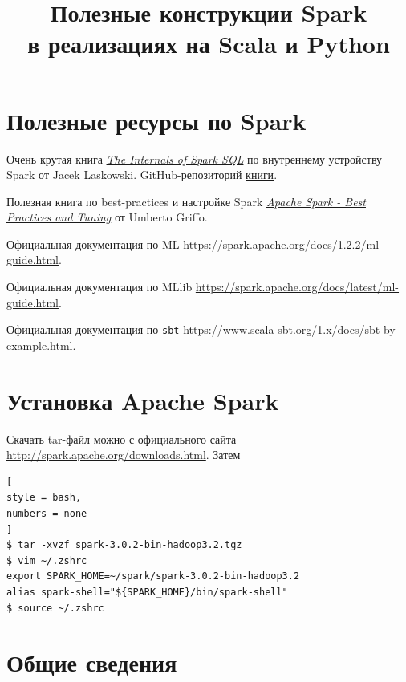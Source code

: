 \documentclass[%
	11pt,
	a4paper,
	utf8,
		]{article}
\begin{document}
\title{Полезные конструкции Spark\\в реализациях на Scala и Python}

\author{}

\date{}
\maketitle

\thispagestyle{fancy}

\tableofcontents


\section{Полезные ресурсы по Spark}

Очень крутая книга \href{https://the-internals-of-spark-sql.readthedocs.io/connector/SupportsRead/}{\textit{The Internals of Spark SQL}} по внутреннему устройству Spark от Jacek Laskowski. GitHub-репозиторий \href{https://github.com/jaceklaskowski/mastering-spark-sql-book}{книги}.

Полезная книга по best-practices и настройке Spark \href{https://umbertogriffo.gitbook.io/apache-spark-best-practices-and-tuning/rdd/treereduce_and_treeaggregate_demystified}{\textit{Apache Spark - Best Practices and Tuning}} от Umberto Griffo.

Официальная документация по ML \url{https://spark.apache.org/docs/1.2.2/ml-guide.html}.

Официальная документация по MLlib \url{https://spark.apache.org/docs/latest/ml-guide.html}.

Официальная документация по \texttt{sbt} \url{https://www.scala-sbt.org/1.x/docs/sbt-by-example.html}.

\section{Установка Apache Spark}

Скачать tar-файл можно с официального сайта \url{http://spark.apache.org/downloads.html}. Затем
\begin{lstlisting}[
style = bash,
numbers = none	
]
$ tar -xvzf spark-3.0.2-bin-hadoop3.2.tgz
$ vim ~/.zshrc
export SPARK_HOME=~/spark/spark-3.0.2-bin-hadoop3.2
alias spark-shell="${SPARK_HOME}/bin/spark-shell"
$ source ~/.zshrc
\end{lstlisting}

\section{Общие сведения}
\end{document}
